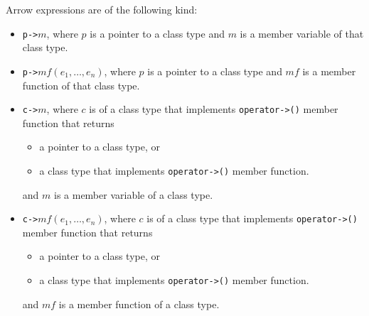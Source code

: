 \documentclass[a4paper,oneside,11pt]{book}
\theoremstyle{definition}
\begin{document}
Arrow expressions are of the following kind:
\begin{itemize}
\item
\verb|p->|$m$, where $p$ is a pointer to a class type and $m$ is a member variable of that class type.
\item
\verb|p->|$mf(e_1, \ldots, e_n)$, where $p$ is a pointer to a class type and $mf$ is a member function of that class type.
\item
\verb|c->|$m$, where $c$ is of a class type that implements \verb|operator->()| member function that returns
\begin{itemize}
\item
a pointer to a class type, or
\item
a class type that implements \verb|operator->()| member function.
\end{itemize}
and $m$ is a member variable of a class type.
\item
\verb|c->|$mf(e_1, \ldots, e_n)$, where $c$ is of a class type that implements \verb|operator->()| member function that returns
\begin{itemize}
\item
a pointer to a class type, or
\item
a class type that implements \verb|operator->()| member function.
\end{itemize}
and $mf$ is a member function of a class type.
\end{itemize}
\end{document}
